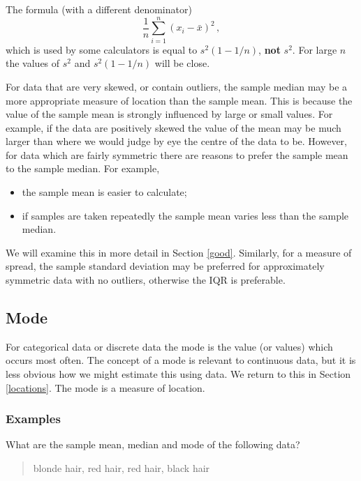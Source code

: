 \documentclass[
  11pt,
  british,
  openany, a4paper]{book}
\providecommand{\tightlist}{%
  \setlength{\itemsep}{0pt}\setlength{\parskip}{0pt}}
\begin{document}
The formula (with a different denominator)
\[ \frac{1}{n}\sum_{i=1}^n (x_i-\bar{x})^2 \,,\]
which is used by some calculators is equal to \(s^2 (1-1/n)\), \textbf{not} \(s^2\). For large \(n\) the values of \(s^2\) and \(s^2(1-1/n)\) will be close.

For data that are very skewed, or contain outliers, the sample median may be a more appropriate measure of location than the sample mean. This is because the value of the sample mean is strongly influenced by large or small values. For example, if the data are positively skewed the value of the mean may be much larger than where we would judge by eye the centre of the data to be. However, for data which are fairly symmetric there are reasons to prefer the sample mean to the sample median. For example,

\begin{itemize}
\tightlist
\item
  the sample mean is easier to calculate;
\item
  if samples are taken repeatedly the sample mean varies less than the sample median.
\end{itemize}

We will examine this in more detail in Section \ref{good}. Similarly, for a measure of spread, the sample standard deviation may be preferred for approximately symmetric data with no outliers, otherwise the IQR is preferable.

\hypertarget{mode}{%
\subsection{Mode}\label{mode}}

For categorical data or discrete data the mode is the value (or values) which occurs most often. The concept of a mode is relevant to continuous data, but it is less obvious how we might estimate this using data. We return to this in Section \ref{locations}. The mode is a measure of location.

\hypertarget{examples}{%
\subsubsection*{Examples}\label{examples}}

What are the sample mean, median and mode of the following data?

\begin{quote}
blonde hair, red hair, red hair, black hair
\end{quote}
\end{document}
